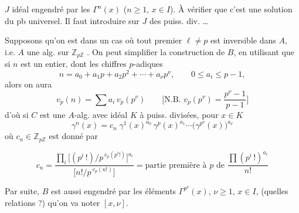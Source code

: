 \documentclass[11pt,a4paper]{article}
\begin{document}
$J$ idéal engendré par les $\Gamma^{n}(x)$ ($n \geqslant 1$, $x \in I$).
 À vérifier que c'est une solution du pb
universel. Il faut introduire sur $J$ des puiss. div. \ldots\ \struck{\ill{}}


Supposons qu'on est dans un
cas où tout premier $\ell \neq p$
est inversible dans $A$, i.e. $A$ une
alg. sur $\mathbb{Z}_{p\mathbb{Z}}$ .
On peut simplifier la construction de $B$,
en utilisant que si $n$ est un entier, dont les
chiffres $p$-adiques \struck{\ill{}}
\[
  n = a_{0} + a_{1} p + a_{2} p^{2} + \cdots + a_{\nu} p^{\nu}, \qquad 0 \leqslant a_{i} \leqslant p-1,
\]
alors on aura
\[
  v_{p}(n) = \sum a_{i}\, v_{p}(p^{\nu}) \qquad \Big[\text{N.B. } v_{p}(p^{\nu}) = \frac{p^{\nu}-1}{p-1}\Big]
\]
d'où si $C$ est une $A$-alg.
avec idéal $K$ à puiss. divisées, pour $x \in K$
\[
  \gamma^{n}(x) = c_{n}\; \gamma^{1}(x)^{a_{0}}\, \gamma^{p}(x)^{a_{1}} \cdots \big(\gamma^{p^{\nu}}(x)\big)^{a_{\nu}}
\]
où $c_{n} \in \mathbb{Z}_{p\mathbb{Z}}$ est donné par

\[
  c_{n} = \frac{\prod_{i} \big[(p^{i}\,!)/p^{\,v_{p}(p^{i}!)}\big]^{a_{i}}}{\big[n!/p^{\,v_{p}(n!)}\big]}
  = \text{partie première à } p \text{ de } \frac{\prod (p^{i}\,!)^{a_{i}}}{n!}
\]

Par suite, $B$ est aussi engendré par les éléments $\Gamma^{p^{\nu}}(x)$,
$\nu \geqslant 1$, $x \in I$, (quelles relations ?) qu'on
va noter $[x, \nu]$.
\end{document}
